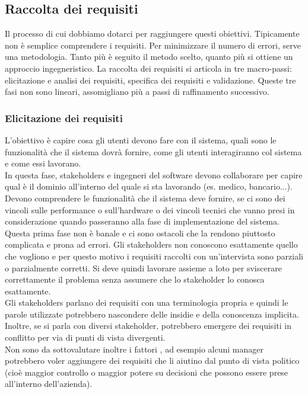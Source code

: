 \subsection{Raccolta dei requisiti}
Il processo di cui dobbiamo dotarci per raggiungere questi obiettivi.
Tipicamente non è semplice comprendere i requisiti.
Per minimizzare il numero di errori, serve una metodologia.
Tanto più è seguito il metodo scelto, quanto più si ottiene un approccio ingegneristico.
La raccolta dei requisiti si articola in tre macro-passi: elicitazione e analisi dei requisiti, specifica dei requisiti e validazione. Queste tre fasi non sono lineari, assomigliano più a passi di raffinamento successivo.

\subsubsection{Elicitazione dei requisiti}
L'obiettivo è capire cosa gli utenti devono fare con il sistema, quali sono le funzionalità che il sistema dovrà fornire, come gli utenti interagiranno col sistema e come essi lavorano.\\
In questa fase, stakeholders e ingegneri del software devono collaborare per capire qual è il dominio all'interno del quale si sta lavorando (es. medico, bancario...).
Devono comprendere le funzionalità che il sistema deve fornire, se ci sono dei vincoli sulle performance o sull'hardware o dei vincoli tecnici che vanno presi in considerazione quando passeranno alla fase di implementazione del sistema.\\
Questa prima fase non è banale e ci sono ostacoli che la rendono piuttosto complicata e prona ad errori.
Gli stakeholders non conoscono esattamente quello che vogliono e per questo motivo i requisiti raccolti con un'intervista sono parziali o parzialmente corretti.
Si deve quindi lavorare assieme a loto per sviscerare correttamente il problema senza assumere che lo stakeholder lo conosca esattamente.\\
Gli stakeholders parlano dei requisiti con una terminologia propria e quindi le parole utilizzate potrebbero nascondere delle insidie e della conoscenza implicita.
Inoltre, se si parla con diversi stakeholder, potrebbero emergere dei requisiti in conflitto per via di punti di vista divergenti.\\
Non sono da sottovalutare inoltre i fattori , ad esempio alcuni manager potrebbero voler aggiungere dei requisiti che li aiutino dal punto di vista politico (cioè maggior controllo o maggior potere su decisioni che possono essere prese all'interno dell'azienda).\\

